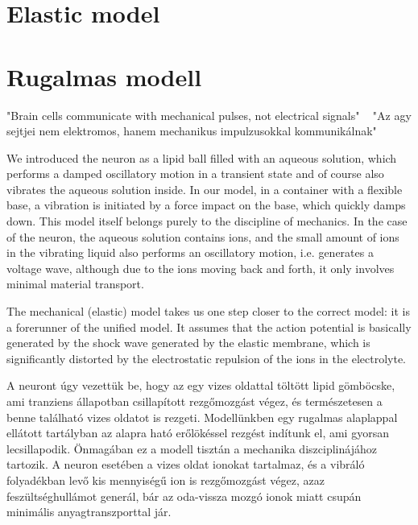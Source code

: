 
\ifx\magyar\undefined
\chapter[Elastic model]{Elastic model\label{ch:V2Model-Elastic}}
\else
\chapter[Rugalmas modell]{Rugalmas modell\label{ch:V2Model-Elastic}}
\fi

\iflatexml
\else
\minitoc
\fi

\ifx\magyar\undefined
\quotationbox
{
"Brain cells communicate
with mechanical pulses, not electrical signals" ~\cite{MechanicalBrainPulses:2018}
}
\else
\quotationbox
{
"Az agy sejtjei nem elektromos, hanem mechanikus
impulzusokkal kommunikálnak" ~\cite{MechanicalBrainPulses:2018}
}
\fi

\ifx\magyar\undefined
We introduced the neuron as a lipid ball filled with an aqueous solution, which performs a damped oscillatory motion in a transient state and of course also vibrates the aqueous solution inside. In our model, in a container with a flexible base, a vibration is initiated by a force impact on the base,
which quickly damps down. This model itself belongs purely to the discipline of mechanics. In the case of the neuron, the aqueous solution
contains
ions, and the small amount of ions in the vibrating liquid also performs an oscillatory motion, i.e. generates a voltage wave,
although due to the ions moving back and forth, it only involves minimal material transport.

The mechanical (elastic) model takes us one step closer to the correct model: it is a forerunner of the unified model. It assumes that the action potential is basically generated by the shock wave generated by the elastic membrane, which is significantly distorted by the electrostatic repulsion of the ions in the electrolyte.

\else
A neuront úgy vezettük be, hogy az egy vizes oldattal töltött
lipid gömböcske, ami tranziens állapotban csillapított rezgőmozgást végez, és természetesen a benne található vizes 
oldatot is rezgeti. Modellünkben egy rugalmas alaplappal ellátott
tartályban az alapra ható erőlökéssel rezgést indítunk el,
ami gyorsan lecsillapodik. Önmagában ez a modell tisztán a mechanika 
diszciplinájához tartozik. A neuron esetében a vizes oldat
ionokat tartalmaz, és a vibráló folyadékban levő kis mennyiségű
ion is rezgőmozgást végez, azaz feszültséghullámot generál,
bár az oda-vissza mozgó ionok miatt csupán minimális anyagtranszporttal jár.

